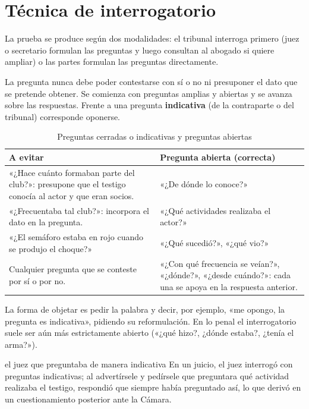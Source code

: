 \documentclass[12pt,oneside]{book}
\begin{document}
\section{Técnica de interrogatorio}

La prueba se produce según dos modalidades: el tribunal interroga primero (juez o secretario formulan las preguntas y luego consultan al abogado si quiere ampliar) o las partes formulan las preguntas directamente.

\begin{importante}
La pregunta nunca debe poder contestarse con sí o no ni presuponer el dato que se pretende obtener. Se comienza con preguntas amplias y abiertas y se avanza sobre las respuestas. Frente a una pregunta \textbf{indicativa} (de la contraparte o del tribunal) corresponde oponerse.
\end{importante}

\begin{table}[H]
\centering
\caption{Preguntas cerradas o indicativas y preguntas abiertas}
\begin{tabularx}{\textwidth}{X X}
\toprule
\textbf{A evitar} & \textbf{Pregunta abierta (correcta)} \\
\midrule
«¿Hace cuánto formaban parte del club?»: presupone que el testigo conocía al actor y que eran socios. & «¿De dónde lo conoce?» \\
«¿Frecuentaba tal club?»: incorpora el dato en la pregunta. & «¿Qué actividades realizaba el actor?» \\
«¿El semáforo estaba en rojo cuando se produjo el choque?» & «¿Qué sucedió?», «¿qué vio?» \\
Cualquier pregunta que se conteste por sí o por no. & «¿Con qué frecuencia se veían?», «¿dónde?», «¿desde cuándo?»: cada una se apoya en la respuesta anterior. \\
\bottomrule
\end{tabularx}
\end{table}

La forma de objetar es pedir la palabra y decir, por ejemplo, «me opongo, la pregunta es indicativa», pidiendo su reformulación. En lo penal el interrogatorio suele ser aún más estrictamente abierto («¿qué hizo?, ¿dónde estaba?, ¿tenía el arma?»).

\begin{ejemplo}{el juez que preguntaba de manera indicativa}
En un juicio, el juez interrogó con preguntas indicativas; al advertírsele y pedírsele que preguntara qué actividad realizaba el testigo, respondió que siempre había preguntado así, lo que derivó en un cuestionamiento posterior ante la Cámara.
\end{ejemplo}
\end{document}
